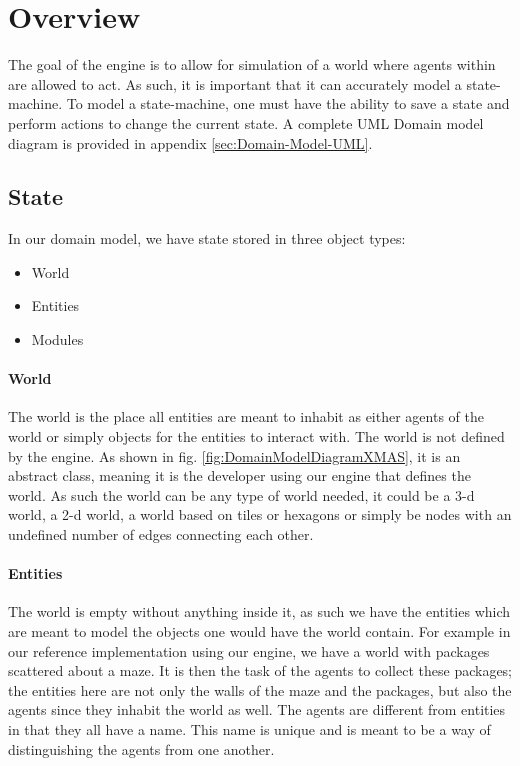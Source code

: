 
\section{Overview}

The goal of the engine is to allow for simulation of a world where
agents within are allowed to act. As such, it is important that it
can accurately model a state-machine. To model a state-machine, one
must have the ability to save a state and perform actions to change
the current state. A complete UML Domain model diagram is provided
in appendix \ref{sec:Domain-Model-UML}.


\subsection{State}

In our domain model, we have state stored in three object types:
\begin{itemize}
\item World
\item Entities
\item Modules
\end{itemize}

\paragraph*{World}

The world is the place all entities are meant to inhabit as either
agents of the world or simply objects for the entities to interact
with. The world is not defined by the engine. As shown in fig. \ref{fig:DomainModelDiagramXMAS},
it is an abstract class, meaning it is the developer using our engine
that defines the world. As such the world can be any type of world
needed, it could be a 3-d world, a 2-d world, a world based on tiles
or hexagons or simply be nodes with an undefined number of edges connecting
each other.


\paragraph*{Entities}

The world is empty without anything inside it, as such we have the
entities which are meant to model the objects one would have the world
contain. For example in our reference implementation using our engine,
we have a world with packages scattered about a maze. It is then the
task of the agents to collect these packages; the entities here are
not only the walls of the maze and the packages, but also the agents
since they inhabit the world as well. The agents are different from
entities in that they all have a name. This name is unique and is
meant to be a way of distinguishing the agents from one another. 


